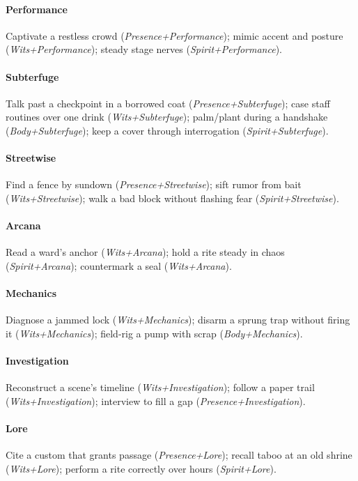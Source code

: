 \paragraph{Performance}
Captivate a restless crowd (\emph{Presence+Performance}); mimic accent and posture (\emph{Wits+Performance}); steady stage nerves (\emph{Spirit+Performance}).

\paragraph{Subterfuge}
Talk past a checkpoint in a borrowed coat (\emph{Presence+Subterfuge}); case staff routines over one drink (\emph{Wits+Subterfuge}); palm/plant during a handshake (\emph{Body+Subterfuge}); keep a cover through interrogation (\emph{Spirit+Subterfuge}).

\paragraph{Streetwise}
Find a fence by sundown (\emph{Presence+Streetwise}); sift rumor from bait (\emph{Wits+Streetwise}); walk a bad block without flashing fear (\emph{Spirit+Streetwise}).

\paragraph{Arcana}
Read a ward's anchor (\emph{Wits+Arcana}); hold a rite steady in chaos (\emph{Spirit+Arcana}); countermark a seal (\emph{Wits+Arcana}).

\paragraph{Mechanics}
Diagnose a jammed lock (\emph{Wits+Mechanics}); disarm a sprung trap without firing it (\emph{Wits+Mechanics}); field-rig a pump with scrap (\emph{Body+Mechanics}).

\paragraph{Investigation}
Reconstruct a scene's timeline (\emph{Wits+Investigation}); follow a paper trail (\emph{Wits+Investigation}); interview to fill a gap (\emph{Presence+Investigation}).

\paragraph{Lore}
Cite a custom that grants passage (\emph{Presence+Lore}); recall taboo at an old shrine (\emph{Wits+Lore}); perform a rite correctly over hours (\emph{Spirit+Lore}).


